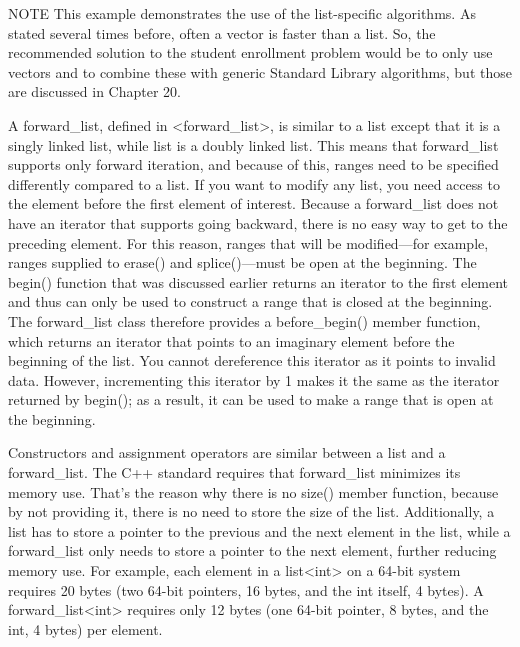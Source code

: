 \begin{myNotic}{NOTE}
This example demonstrates the use of the list-specific algorithms. As stated several times before, often a vector is faster than a list. So, the recommended solution to the student enrollment problem would be to only use vectors and to combine these with generic Standard Library algorithms, but those are discussed in Chapter 20.
\end{myNotic}


A forward\_list, defined in <forward\_list>, is similar to a list except that it is a singly linked list, while list is a doubly linked list. This means that forward\_list supports only forward iteration, and because of this, ranges need to be specified differently compared to a list. If you want to modify any list, you need access to the element before the first element of interest. Because a forward\_list does not have an iterator that supports going backward, there is no easy way to get to the preceding element. For this reason, ranges that will be modified—for example, ranges supplied to erase() and splice()—must be open at the beginning. The begin() function that was discussed earlier returns an iterator to the first element and thus can only be used to construct a range that is closed at the beginning. The forward\_list class therefore provides a before\_begin() member function, which returns an iterator that points to an imaginary element before the beginning of the list. You cannot dereference this iterator as it points to invalid data. However, incrementing this iterator by 1 makes it the same as the iterator returned by begin(); as a result, it can be used to make a range that is open at the beginning.

Constructors and assignment operators are similar between a list and a forward\_list. The C++ standard requires that forward\_list minimizes its memory use. That’s the reason why there is no size() member function, because by not providing it, there is no need to store the size of the list. Additionally, a list has to store a pointer to the previous and the next element in the list, while a forward\_list only needs to store a pointer to the next element, further reducing memory use. For example, each element in a list<int> on a 64-bit system requires 20 bytes (two 64-bit pointers, 16 bytes, and the int itself, 4 bytes). A forward\_list<int> requires only 12 bytes (one 64-bit pointer, 8 bytes, and the int, 4 bytes) per element.

